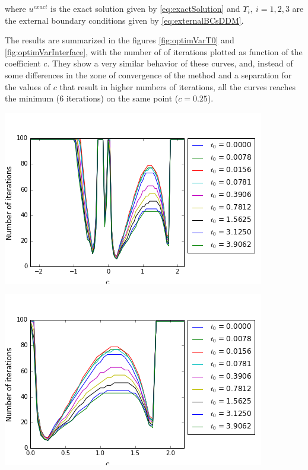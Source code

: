 \noindent where $u^{exact}$ is the exact solution given by \ref{eq:exactSolution} and $\Upsilon_i , \ i =1,2,3$ are the external boundary conditions given by \ref{eq:externalBCsDDM}.

\indent The results are summarized in the figures \ref{fig:optimVarT0} and \ref{fig:optimVarInterface}, with the number of of iterations plotted as function of the coefficient $c$. They show a very similar behavior of these curves, and, instead of some differences in the zone of convergence of the method and a separation for the values of $c$ that result in higher numbers of iterations, all the curves reaches the minimum (6 iterations) on the same point ($c = 0.25$).

\begingroup
\begin{minipage}{.5\linewidth}
\begin{center}
	\includegraphics[scale=.4]{figures/NiterxCoefVarT0NegativeCoefCorrectN.png}
\end{center}
\end{minipage}
\begin{minipage}{.5\linewidth}
\begin{center}
	\includegraphics[scale=.4]{figures/NiterxCoefVarT0CorrectN.png}
\end{center}
\end{minipage}
\endgroup

